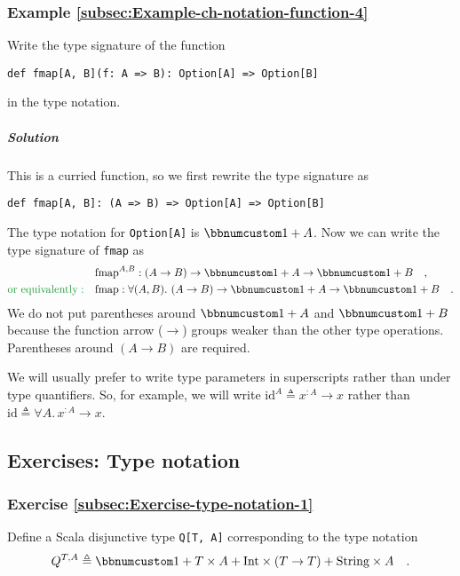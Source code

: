 \subsubsection{Example \label{subsec:Example-ch-notation-function-4}\ref{subsec:Example-ch-notation-function-4}}

Write the type signature of the function
\begin{lstlisting}
def fmap[A, B](f: A => B): Option[A] => Option[B]
\end{lstlisting}
in the type notation.

\subparagraph{Solution}

This is a curried function, so we first rewrite the type signature
as
\begin{lstlisting}
def fmap[A, B]: (A => B) => Option[A] => Option[B]
\end{lstlisting}
The type notation for \lstinline!Option[A]! is $\bbnum 1+A$. Now
we can write the type signature of \lstinline!fmap! as
\begin{align*}
 & \text{fmap}^{A,B}:\left(A\rightarrow B\right)\rightarrow\bbnum 1+A\rightarrow\bbnum 1+B\quad,\\
{\color{greenunder}\text{or equivalently}:}\quad & \text{fmap}:\forall(A,B).\,\left(A\rightarrow B\right)\rightarrow\bbnum 1+A\rightarrow\bbnum 1+B\quad.
\end{align*}
We do not put parentheses around $\bbnum 1+A$ and $\bbnum 1+B$ because
the function arrow ($\rightarrow$) groups weaker than the other type
operations. Parentheses around $\left(A\rightarrow B\right)$ are
required.

We will usually prefer to write type parameters in superscripts rather
than under type quantifiers. So, for example, we will write $\text{id}^{A}\triangleq x^{:A}\rightarrow x$
rather than $\text{id}\triangleq\forall A.\,x^{:A}\rightarrow x$.

\subsection{Exercises: Type notation}

\subsubsection{Exercise \label{subsec:Exercise-type-notation-1}\ref{subsec:Exercise-type-notation-1}}

Define a Scala disjunctive type \lstinline!Q[T, A]! corresponding
to the type notation
\[
Q^{T,A}\triangleq\bbnum 1+T\times A+\text{Int}\times(T\rightarrow T)+\text{String}\times A\quad.
\]


